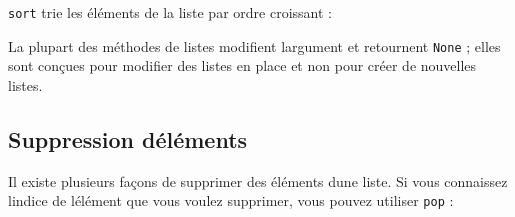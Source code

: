 \texttt{sort} trie les éléments de la liste par ordre croissant :

\begin{Shaded}
\begin{Highlighting}[]
\OperatorTok{\textgreater{}\textgreater{}\textgreater{}}\OperatorTok{=}\NormalTok{ [}\NormalTok{, }\NormalTok{, }\NormalTok{, }\NormalTok{, }\NormalTok{]}
\OperatorTok{\textgreater{}\textgreater{}\textgreater{}}
\OperatorTok{\textgreater{}\textgreater{}\textgreater{}}
\NormalTok{[}\NormalTok{, }\NormalTok{, }\NormalTok{, }\NormalTok{, }\NormalTok{]}
\end{Highlighting}
\end{Shaded}

La plupart des méthodes de listes modifient l\textquotesingle argument
et retournent \texttt{None} ; elles sont conçues pour modifier des
listes en place et non pour créer de nouvelles listes.

\hypertarget{suppression-duxe9luxe9ments}{%
\subsection{Suppression
d\textquotesingle éléments}\label{suppression-duxe9luxe9ments}}

Il existe plusieurs façons de supprimer des éléments
d\textquotesingle une liste. Si vous connaissez l\textquotesingle indice
de l\textquotesingle élément que vous voulez supprimer, vous pouvez
utiliser \texttt{pop} :

\begin{Shaded}
\begin{Highlighting}[]
\OperatorTok{\textgreater{}\textgreater{}\textgreater{}}\OperatorTok{=}\NormalTok{ [}\NormalTok{, }\NormalTok{, }\NormalTok{]}
\OperatorTok{\textgreater{}\textgreater{}\textgreater{}}\OperatorTok{=}\NormalTok{)}
\OperatorTok{\textgreater{}\textgreater{}\textgreater{}}
\NormalTok{[}\NormalTok{, }\NormalTok{]}
\OperatorTok{\textgreater{}\textgreater{}\textgreater{}}
\end{Highlighting}
\end{Shaded}

